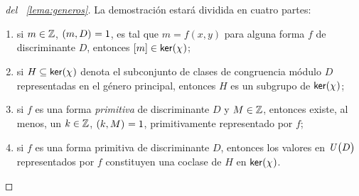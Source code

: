 \begin{proof}[\proofname~del \lemaname~\ref{lema:generos}]
	La demostraci\'on estar\'a dividida en cuatro partes:
	\begin{enumerate}[1]
		\item\label{item:lema:generos:nucleo}
			si $m\in\Enteros$, $\mcd{m,D}=1$, es tal que
			$m=f(x,y)$ para alguna forma $f$ de discriminante
			$D$, entonces $\clase m\in\ker(\varkronecker)$;
		\item\label{item:lema:generos:subgrupo}
			si $H\subseteq\ker(\varkronecker)$ denota el subconjunto de
			clases de congruencia m\'odulo $D$ representadas
			en el g\'enero principal,
			entonces $H$ es un subgrupo de $\ker(\varkronecker)$;
		\item\label{item:lema:generos:primitivas}
			si $f$ es una forma \emph{primitiva} de discriminante
			$D$ y $M\in\Enteros$, entonces existe, al menos,
			un $k\in\Enteros$, $\mcd{k,M}=1$, primitivamente
			representado por $f$;
		\item\label{item:lema:generos:coclases}
			si $f$ es una forma primitiva de discriminante $D$,
			entonces los valores en $\Unidadesmod[D]$
			representados por $f$ constituyen una coclase de
			$H$ en $\ker(\varkronecker)$.
	\end{enumerate}


\end{proof}
